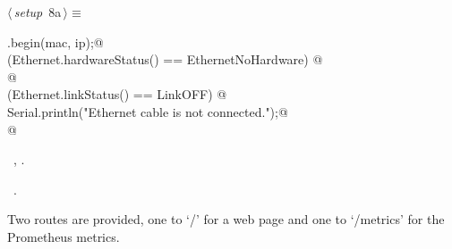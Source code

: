 \documentclass[a4paper, 11pt]{article}
\begin{document}
\begin{flushleft} \small
\begin{minipage}{\linewidth}\label{scrap9}\raggedright\small
{}$\langle\,${\itshape setup}\nobreak\ {\footnotesize{8a}}$\,\rangle\equiv$
\vspace{-1ex}
\begin{list}{}{\setlength{\leftmargin}{1em}} \item
\mbox{}\lstinline@Ethernet.begin(mac, ip);@\\
\mbox{}\lstinline@if (Ethernet.hardwareStatus() == EthernetNoHardware) @\\
\mbox{}@\\
\mbox{}\lstinline@if (Ethernet.linkStatus() == LinkOFF) {@\\
\mbox{}\lstinline@  Serial.println("Ethernet cable is not connected.");@\\
\mbox{}\lstinline@}@\\
\mbox{}{\NWsep}
\end{list}
\vspace{-1ex}
\vspace{-1ex}
\footnotesize
\begin{list}{}{\setlength{\itemsep}{-\parsep}\setlength{\itemindent}{-\leftmargin}}
\item \NWtxtMacroDefBy\ , .
\item \NWtxtMacroRefIn\ .
\end{list}
\end{minipage}
\end{flushleft}

Two routes are provided,
one to `/' for a web page and one to `/metrics' for the Prometheus metrics.
\end{document}
